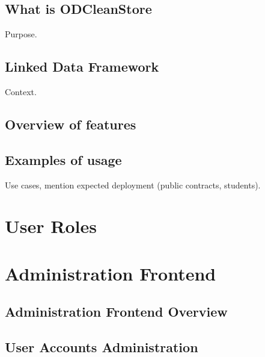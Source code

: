 
\newcommand{\version}{0.1}
\newcommand{\documentname}{User Manual}






\renewcommand{\contentsname}{Contents}
\tableofcontents
\bigskip

\newpage



\section{What is ODCleanStore}

Purpose.

\section{Linked Data Framework}

Context.

\section{Overview of features}

\section{Examples of usage}

Use cases, mention expected deployment (public contracts, students).

\chapter{User Roles}

\chapter{Administration Frontend}

\section{Administration Frontend Overview}

\section{User Accounts Administration}

